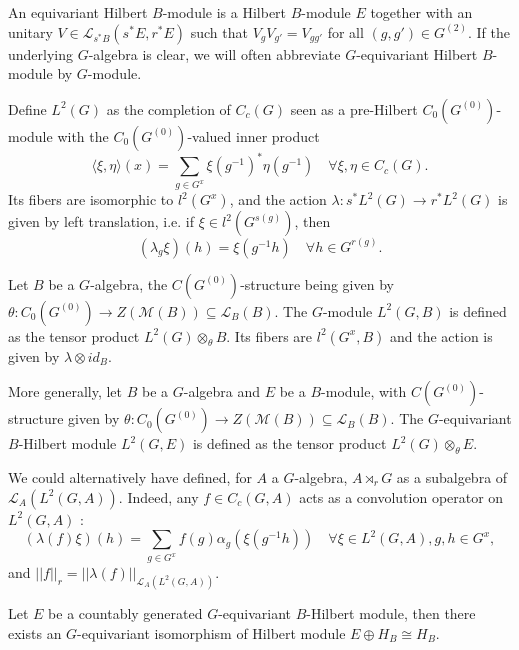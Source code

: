 \begin{definition}
An equivariant Hilbert $B$-module is a Hilbert $B$-module $E$ together with an unitary $V\in\mathcal L_{s^* B}(s^*E ,r^* E)$ such that $V_gV_{g'} = V_{gg'}$ for all $(g,g')\in G^{(2)}$. If the underlying $G$-algebra is clear, we will often abbreviate $G$-equivariant Hilbert $B$-module by $G$-module.
\end{definition}

\begin{Expl} Define $L^2(G)$ as the completion of $C_c(G)$ seen as a pre-Hilbert $C_0(G^{(0)})$-module with the $C_0(G^{(0)})$-valued inner product 
\[\langle \xi ,\eta\rangle (x) = \sum_{g\in G^x} \xi(g^{-1})^*\eta(g^{-1}) \quad \forall \xi,\eta\in C_c(G).\]
Its fibers are isomorphic to $l^2(G^x)$, and the action $\lambda : s^*L^2(G) \rightarrow r^* L^2(G)$ is given by left translation, i.e. if $\xi\in l^2(G^{s(g)})$, then
\[(\lambda_g\xi)(h) = \xi(g^{-1}h)\quad \forall h\in G^{r(g)}.\]
\end{Expl}

\begin{Expl} Let $B$ be a $G$-algebra, the $C(G^{(0)})$-structure being given by $\theta : C_0(G^{(0)})\rightarrow Z(\mathcal M(B))\subseteq \mathcal L_B(B)$. The $G$-module $L^2(G,B)$ is defined as the tensor product $ L^2(G)\otimes_\theta B$. Its fibers are $l^2(G^x,B)$ and the action is given by $\lambda\otimes id_{B}$.
\end{Expl}

\begin{Expl} More generally, let $B$ be a $G$-algebra and $E$ be a $B$-module, with $C(G^{(0)})$-structure given by $\theta : C_0(G^{(0)})\rightarrow Z(\mathcal M(B))\subseteq \mathcal L_B(B)$. The $G$-equivariant $B$-Hilbert module $L^2(G,E)$ is defined as the tensor product $ L^2(G)\otimes_\theta E$.
\end{Expl}

\begin{rk}
We could alternatively have defined, for $A$ a $G$-algebra, $A\rtimes_r G$ as a subalgebra of $\mathcal L_A(L^2(G,A))$. Indeed, any $f\in C_c(G,A)$ acts as a convolution operator on $L^2(G,A)$ :
\[(\lambda(f)\xi)(h) = \sum_{g\in G^x} f(g)\alpha_g(\xi(g^{-1} h))\quad \forall \xi\in L^2(G,A),g,h\in G^x,\]
and $||f||_{r} = ||\lambda(f)||_{\mathcal L_A (L^2(G,A))}$.
\end{rk}

\begin{lem} \label{GStabilization} Let $E$ be a countably generated $G$-equivariant $B$-Hilbert module, then there exists an $G$-equivariant isomorphism of Hilbert module $E \oplus H_B \cong H_B$.
\end{lem}

